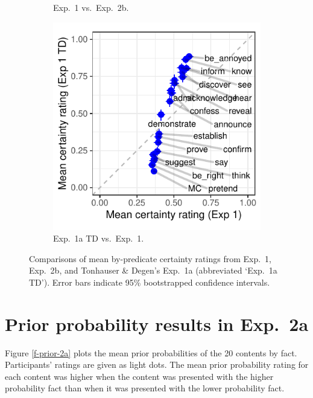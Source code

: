 \documentclass[11pt,fleqn]{article}
\newcommand{\6}{\mbox{$[\hspace*{-.6mm}[$}}
\newcommand{\9}{\mbox{$]\hspace*{-.6mm}]$}}
\begin{document}
\begin{figure}[h!]
\begin{subfigure}{.33\textwidth}
\caption{Exp.~1 vs.\ Exp.~2b.}
\label{f-projcomp2}
\end{subfigure}
\begin{subfigure}{.33\textwidth}
\includegraphics[width=\textwidth]{../../results/projection-comparisons/graphs/projection-comparison-59}
\caption{Exp.~1a TD vs.\  Exp.~1.}
\label{f-projcomp3}
\end{subfigure}
\caption{Comparisons of mean by-predicate certainty ratings from Exp.~1, Exp.~2b, and Tonhauser \& Degen's Exp.~1a (abbreviated `Exp.~1a TD'). Error bars indicate 95\% bootstrapped confidence intervals.}
\label{f-projection-comparisons}
\end{figure}

\section{Prior probability results in Exp.~2a}\label{a-exp2}

Figure \ref{f-prior-2a} plots the mean prior probabilities of the 20 contents by fact. Participants' ratings are given as light dots. The mean prior probability rating for each content was higher when the content was presented with the higher probability fact than when it was presented with the lower probability fact.
\end{document}
